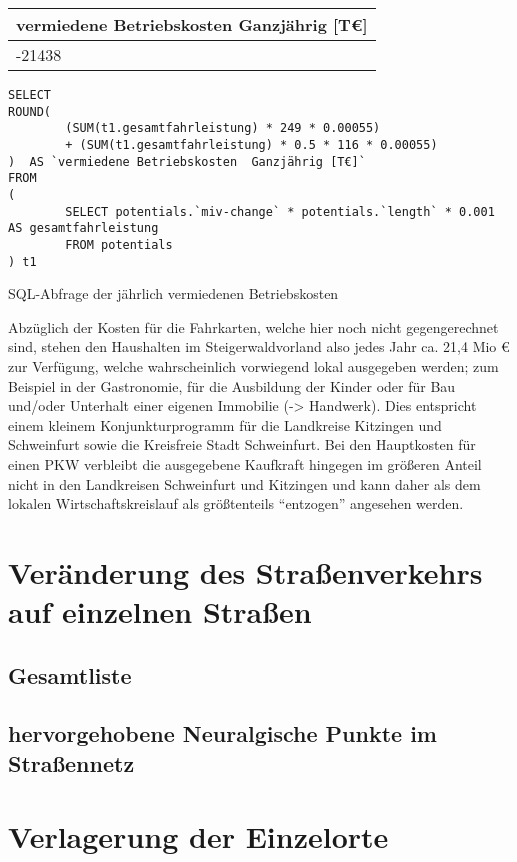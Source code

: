 \documentclass[fontsize=12pt,a4paper]{scrreprt}
\begin{document}
\begin{tabular}{ | l |}
        \hline
        vermiedene Betriebskosten  Ganzjährig [T€] \\
        \hline
        -21438                                     \\
        \hline
\end{tabular}

\begin{listing}[htbp]
        \begin{verbatim}
SELECT 
ROUND(
        (SUM(t1.gesamtfahrleistung) * 249 * 0.00055) 
        + (SUM(t1.gesamtfahrleistung) * 0.5 * 116 * 0.00055)
)  AS `vermiedene Betriebskosten  Ganzjährig [T€]`
FROM
(
        SELECT potentials.`miv-change` * potentials.`length` * 0.001 AS gesamtfahrleistung
        FROM potentials
) t1
\end{verbatim}
        \caption{SQL-Abfrage der jährlich vermiedenen Betriebskosten}\label{lst-betriebskosten-jaehrlich}
\end{listing}

Abzüglich der Kosten für die Fahrkarten, welche hier noch nicht gegengerechnet sind, stehen den Haushalten im Steigerwaldvorland also jedes Jahr ca. 21,4 Mio € zur Verfügung, welche wahrscheinlich vorwiegend lokal ausgegeben werden; zum Beispiel in der Gastronomie, für die Ausbildung der Kinder oder für Bau und/oder Unterhalt einer eigenen Immobilie (-> Handwerk). Dies entspricht einem kleinem Konjunkturprogramm für die Landkreise Kitzingen und Schweinfurt sowie die Kreisfreie Stadt Schweinfurt. Bei den Hauptkosten für einen PKW verbleibt die ausgegebene Kaufkraft hingegen im größeren Anteil nicht in den Landkreisen Schweinfurt und Kitzingen und kann daher als dem lokalen Wirtschaftskreislauf als größtenteils \enquote{entzogen} angesehen werden.

\section{Veränderung des Straßenverkehrs auf einzelnen Straßen}
\subsection{Gesamtliste}
\subsection{hervorgehobene Neuralgische Punkte im Straßennetz}
\section{Verlagerung der Einzelorte}
\end{document}

